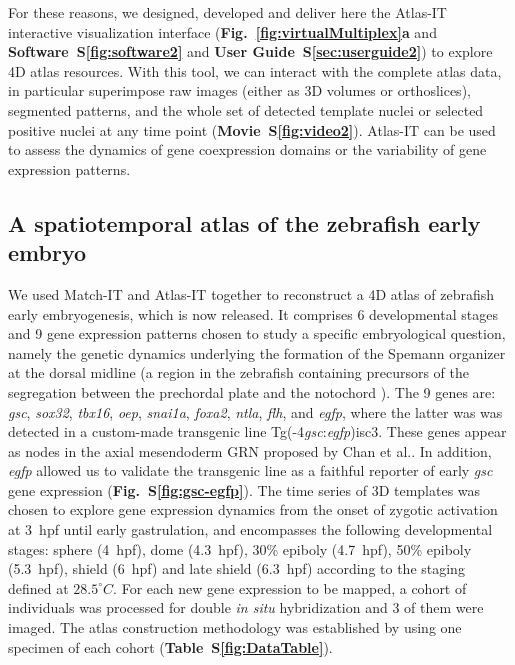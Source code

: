For these reasons, we designed, developed and deliver here the Atlas-IT interactive visualization interface (\textbf{Fig.~\ref{fig:virtualMultiplex}a} and \textbf{Software~S\ref{fig:software2}} and \textbf{User Guide~S\ref{sec:userguide2}}) to explore 4D atlas resources. With this tool, we can interact with the complete atlas data, in particular superimpose raw images (either as 3D volumes or orthoslices), segmented patterns, and the whole set of detected template nuclei or selected positive nuclei at any time point (\textbf{Movie~S\ref{fig:video2}}). Atlas-IT can be used to assess the dynamics of gene coexpression domains or the variability of gene expression patterns.

\subsection*{A spatiotemporal atlas of the zebrafish early embryo}

We used Match-IT and Atlas-IT together to reconstruct a 4D atlas of zebrafish early embryogenesis, which is now released. It comprises 6 developmental stages and 9 gene expression patterns chosen to study a specific embryological question, namely the genetic dynamics underlying the formation of the Spemann organizer at the dorsal midline\cite{schier2005molecular} (a region in the zebrafish containing precursors of the segregation between the prechordal plate and the notochord \cite{saude2000axis}). The 9 genes are: \emph{gsc}, \emph{sox32}, \emph{tbx16}, \emph{oep}, \emph{snai1a}, \emph{foxa2}, \emph{ntla}, \emph{flh}, and \emph{egfp}, where the latter was was detected in a custom-made transgenic line Tg(-4\emph{gsc}:\emph{egfp})isc3. These genes appear as nodes in the axial mesendoderm GRN proposed by Chan et al.\cite{chan2009developmental}. In addition, \emph{egfp} allowed us to validate the transgenic line as a faithful reporter of early \emph{gsc} gene expression (\textbf{Fig.~S\ref{fig:gsc-egfp}}). %
The time series of 3D templates was chosen to explore gene expression dynamics from the onset of zygotic activation at 3~hpf until early gastrulation, and encompasses the following developmental stages: sphere (4~hpf), dome (4.3~hpf), 30\% epiboly (4.7~hpf), 50\% epiboly (5.3~hpf), shield (6~hpf) and late shield (6.3~hpf) according to the staging defined at $28.5^\circ C$. For each new gene expression to be mapped, a cohort of individuals was processed for double \emph{in situ} hybridization and 3 of them were imaged. The atlas construction methodology was established by using one specimen of each cohort (\textbf{Table~S\ref{fig:DataTable}}).

